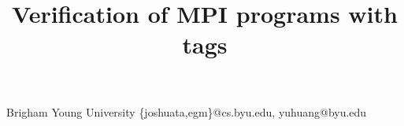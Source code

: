 \documentclass[preprint]{sigplanconf}
\begin{document}
\setlength{\pdfpageheight}{\paperheight}
\setlength{\pdfpagewidth}{\paperwidth}




\title{Verification of MPI programs with tags}

           {Brigham Young University}
           {\{joshuata,egm\}@cs.byu.edu, yuhuang@byu.edu}

\maketitle



















% 



\end{document}
